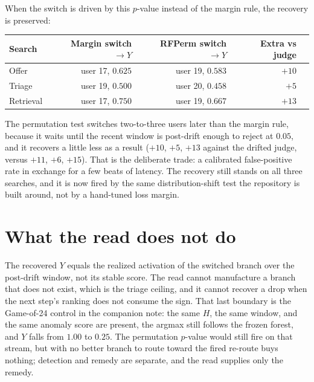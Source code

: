 \documentclass[11pt,a4paper]{article}
\begin{document}
When the switch is driven by this \(p\)-value instead of the margin rule, the recovery is preserved:
\begin{center}
\begin{tabular}{lrrrr}
\toprule
Search & Margin switch \(\to Y\) & RFPerm switch \(\to Y\) & Extra vs judge \\
\midrule
Offer     & user 17, \(0.625\) & user 19, \(0.583\) & \(+10\) \\
Triage    & user 19, \(0.500\) & user 20, \(0.458\) & \(+5\)  \\
Retrieval & user 17, \(0.750\) & user 19, \(0.667\) & \(+13\) \\
\bottomrule
\end{tabular}
\end{center}
The permutation test switches two-to-three users later than the margin rule, because it waits until the recent window is post-drift enough to reject at \(0.05\), and it recovers a little less as a result (\(+10\), \(+5\), \(+13\) against the drifted judge, versus \(+11\), \(+6\), \(+15\)).
That is the deliberate trade: a calibrated false-positive rate in exchange for a few beats of latency.
The recovery still stands on all three searches, and it is now fired by the same distribution-shift test the repository is built around, not by a hand-tuned loss margin.

\section{What the read does not do}
The recovered \(Y\) equals the realized activation of the switched branch over the post-drift window, not its stable score.
The read cannot manufacture a branch that does not exist, which is the triage ceiling, and it cannot recover a drop when the next step's ranking does not consume the sign.
That last boundary is the Game-of-24 control in the companion note: the same \(H\), the same window, and the same anomaly score are present, the argmax still follows the frozen forest, and \(Y\) falls from \(1.00\) to \(0.25\).
The permutation \(p\)-value would still fire on that stream, but with no better branch to route toward the fired re-route buys nothing; detection and remedy are separate, and the read supplies only the remedy.
\end{document}
